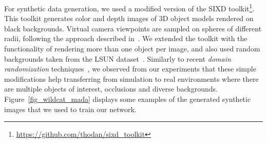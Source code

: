 \documentclass[letterpaper, 10 pt, conference]{ieeeconf}  %
\newcommand{\phil}[1]{\textcolor{blue}{#1}}
\begin{document}
For synthetic data generation, we used a modified version of the SIXD toolkit\footnote{\url{https://github.com/thodan/sixd_toolkit}}. This toolkit generates color and depth images of 3D object models rendered on black backgrounds. Virtual camera viewpoints are sampled on spheres of different radii, following the approach described in~\cite{hinterstoisser2008simultaneous}. We extended the toolkit with the functionality of rendering more than one object per image, and also used random backgrounds taken from the LSUN dataset~\cite{YuZSSX15}. %
Similarly to recent {\it domain randomization} techniques~\cite{DBLP:conf/iros/TobinFRSZA17}, we observed from our experiments that these simple modifications help transferring from simulation to real environments where there are multiple objects of interest, occlusions and diverse backgrounds. Figure~\ref{fig_wildcat_mada} displays some examples of the generated synthetic images that we used to train our network.
\end{document}
